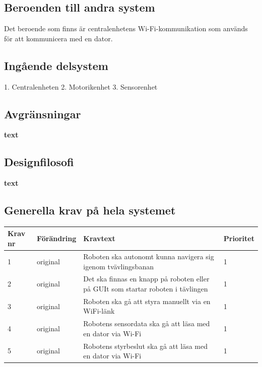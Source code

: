 \documentclass[a4paper,titlepage,12pt]{article}
\begin{document}
	\subsection{Beroenden  till andra system}
	Det beroende som finns är centralenhetens Wi-Fi-kommunikation som används för 
	att kommunicera med en dator.
	\subsection{Ingående delsystem}
	1. Centralenheten
	2. Motorikenhet
	3. Sensorenhet
	\subsection{Avgränsningar}
	\textbf{text}
	\subsection{Designfilosofi}
	\textbf{text}
	\subsection{Generella krav på hela systemet}

	\begin{table}[h!]
		\label{tab:label}
		\begin{tabularx}{\textwidth}{|l|l|X|l|}
		\hline
			\textbf{Krav nr} & \textbf{Förändring} & \textbf{Kravtext} & \textbf{Prioritet} 
				\\ \hline
	
			1 & original & Roboten ska autonomt kunna navigera sig igenom tvävlingsbanan & 1
					\\ \hline

			2 & original & Det ska finnas en knapp på roboten eller på GUIt som startar
				roboten i tävlingen & 1
				\\ \hline

			3 & original & Roboten ska gå att styra manuellt via en WiFi-länk& 1
				\\ \hline
		
			4 & original & Robotens sensordata ska gå att läsa med en dator via Wi-Fi & 1
				\\ \hline

			5 & original & Robotens styrbeslut ska gå att läsa med en dator via Wi-Fi & 1
				\\ \hline
		\end{tabularx}
	\end{table}
\end{document}

